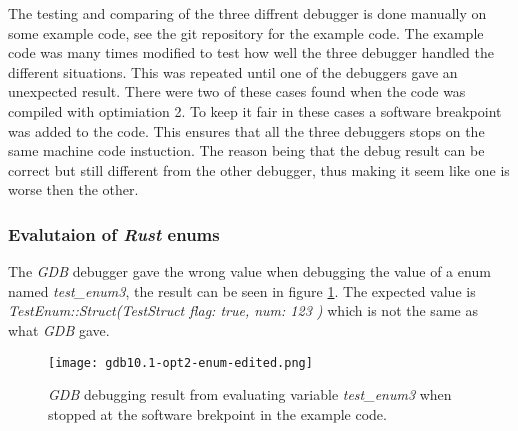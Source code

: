 

The testing and comparing of the three diffrent debugger is done manually on some example code, see the git repository \cite{example-code} for the example code.
The example code was many times modified to test how well the three debugger handled the different situations.
This was repeated until one of the debuggers gave an unexpected result.
There were two of these cases found when the code was compiled with optimiation 2.
To keep it fair in these cases a software breakpoint was added to the code.
This ensures that all the three debuggers stops on the same machine code instuction.
The reason being that the debug result can be correct but still different from the other debugger, thus making it seem like one is worse then the other.


\subsubsection{Evalutaion of \emph{Rust} enums}
The \emph{GDB} debugger gave the wrong value when debugging the value of a enum named \emph{test\_enum3}, the result can be seen in figure \ref{fig:gdbenum}.
The expected value is \emph{TestEnum::Struct(TestStruct { flag: true, num: 123 })} which is not the same as what \emph{GDB} gave.


\begin{figure}[h]
	\centering
	\texttt{[image: gdb10.1-opt2-enum-edited.png]}
	\caption{\emph{GDB} debugging result from evaluating variable \emph{test\_enum3} when stopped at the software brekpoint in the example code.}
	\label{fig:gdbenum}
\end{figure}


